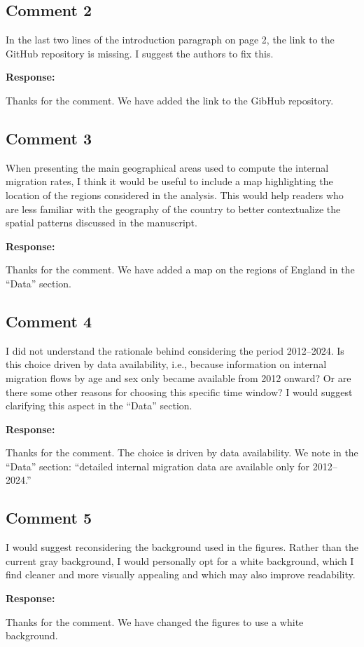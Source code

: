 \documentclass[11pt,a4paper]{article}
\newlength{\replyspace}
\newenvironment{response}{\par\addvspace{\replyspace}\nopagebreak\textbf{\textcolor{replyblue}{Response:}}\par\begingroup\color{replyblue}}{\par\endgroup\vspace{\replyspace}}
\newcommand{\refcomment}[2]{\par\Needspace{5\baselineskip}\subsection*{#1}#2\par}
\begin{document}
\refcomment{Comment 2}{
In the last two lines of the introduction paragraph on page 2, the link to the GitHub repository is missing. I suggest the authors to fix this.
}
\begin{response}
Thanks for the comment. We have added the link to the GibHub repository.
\end{response}

\refcomment{Comment 3}{
When presenting the main geographical areas used to compute the internal migration rates, I think it would be useful to include a map highlighting the location of the regions considered in the analysis. This would help readers who are less familiar with the geography of the country to better contextualize the spatial patterns discussed in the manuscript.
}
\begin{response}
Thanks for the comment. We have added a map on the regions of England in the ``Data'' section.
\end{response}

\refcomment{Comment 4}{
I did not understand the rationale behind considering the period 2012--2024. Is this choice driven by data availability, i.e., because information on internal migration flows by age and sex only became available from 2012 onward? Or are there some other reasons for choosing this specific time window? I would suggest clarifying this aspect in the ``Data'' section.
}
\begin{response}
Thanks for the comment. The choice is driven by data availability. We note in the ``Data'' section: ``detailed internal migration data are available only for 2012–2024.''

\end{response}

\refcomment{Comment 5}{
I would suggest reconsidering the background used in the figures. Rather than the current gray background, I would personally opt for a white background, which I find cleaner and more visually appealing and which may also improve readability.
}
\begin{response}
Thanks for the comment. We have changed the figures to use a white background.
\end{response}
\end{document}

